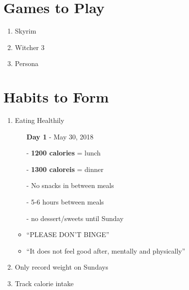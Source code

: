 \documentclass[10pt]{article}
\begin{document}
\section*{Games to Play}
\begin{enumerate}
    \item Skyrim
    \item Witcher 3
    \item Persona 
\end{enumerate}

\newpage
\section*{Habits to Form}
\begin{enumerate}
    \item Eating Healthily
    \begin{itemize}
        \item[] \textbf{Day 1} - May 30, 2018
        \item[-] \textbf{1200 calories} = lunch
        \item[-] \textbf{1300 caloreis} = dinner
        \item[-] No snacks in between meals
        \item[-] 5-6 hours between meals
        \item[-] no dessert/sweets until Sunday
        \item ``PLEASE DON'T BINGE''
        \item ``It does not feel good after, mentally and physically''
    \end{itemize}
    \item Only record weight on Sundays
    \item Track calorie intake
\end{enumerate}
\end{document}
